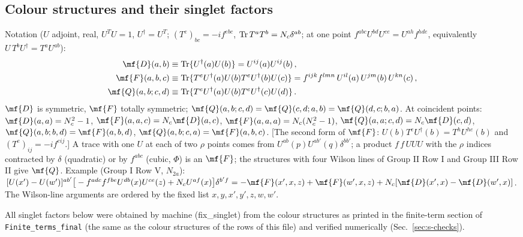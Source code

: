 {\subsection{Colour structures and their singlet factors}
\noindent Notation ($U$ adjoint, real, $U^{T}U=1$, $U^{\dagger}=U^{T}$; $(T^{e})_{bc}=-if^{ebc}$, ${\rm Tr}\,T^{a}T^{b}=N_{c}\delta^{ab}$; at one point $f^{abc}U^{bd}U^{ce}=U^{ah}f^{hde}$, equivalently $U\,T^{b}U^{\dagger}=T^{a}U^{ab}$):
\begin{align}
\mf{D}(a,b)&\equiv{\rm Tr}\{U^{\dagger}(a)U(b)\}=U^{ij}(a)U^{ij}(b)\,,\notag\\
\mf{F}(a,b,c)&\equiv{\rm Tr}\{T^{e}U^{\dagger}(a)U(b)T^{e}U^{\dagger}(b)U(c)\}=f^{ijk}f^{lmn}\,U^{il}(a)\,U^{jm}(b)\,U^{kn}(c)\,,\notag\\
\mf{Q}(a,b;c,d)&\equiv{\rm Tr}\{T^{e}U^{\dagger}(a)U(b)T^{e}U^{\dagger}(c)U(d)\}\,.\notag
\end{align}
$\mf{D}$ is symmetric, $\mf{F}$ totally symmetric; $\mf{Q}(a,b;c,d)=\mf{Q}(c,d;a,b)=\mf{Q}(d,c;b,a)$. At coincident points: $\mf{D}(a,a)=N_{c}^{2}-1$, $\mf{F}(a,a,c)=N_{c}\mf{D}(a,c)$, $\mf{F}(a,a,a)=N_{c}(N_{c}^{2}-1)$, $\mf{Q}(a,a;c,d)=N_{c}\mf{D}(c,d)$, $\mf{Q}(a,b;b,d)=\mf{F}(a,b,d)$, $\mf{Q}(a,b;c,a)=\mf{F}(a,b,c)$. [The second form of $\mf{F}$: $U(b)T^{e}U^{\dagger}(b)=T^{h}U^{he}(b)$ and $(T^{e})_{ij}=-if^{eij}$.] A trace with one $U$ at each of two $\rho$ points comes from $U^{ab}(p)U^{ab'}(q)\delta^{bb'}$; a product $f\,f\,UUU$ with the $\rho$ indices contracted by $\delta$ (quadratic) or by $f^{abc}$ (cubic, $\Phi$) is an $\mf{F}$; the structures with four Wilson lines of Group II Row I and Group III Row II give $\mf{Q}$. Example (Group I Row V, $N_{2a}$): $[U(x')-U(w')]^{ab'}\big[-f^{adc}f^{fbe}U^{db}(x)U^{ce}(z)+N_{c}U^{af}(x)\big]\delta^{b'f}=-\mf{F}(x',x,z)+\mf{F}(w',x,z)+N_{c}[\mf{D}(x',x)-\mf{D}(w',x)]$. The Wilson-line arguments are ordered by the fixed list $x,y,x',y',z,w,w'$.

\noindent All singlet factors below were obtained by machine (fix\_singlet) from the colour structures as printed in the finite-term section of \texttt{Finite\_terms\_final} (the same as the colour structures of the rows of this file) and verified numerically (Sec.~\ref{sec:s-checks}).

}
